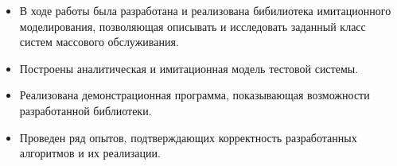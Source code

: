 \documentclass[12pt]{article}
\begin{document}
\small

\begin{itemize}

\item В ходе работы была разработана и реализована бибилиотека имитационного моделирования, позволяющая описывать и исследовать заданный класс систем массового обслуживания.

\item Построены аналитическая и имитационная модель тестовой системы.

\item Реализована демонстрационная программа, показывающая возможности разработанной библиотеки.

\item Проведен ряд опытов, подтверждающих корректность разработанных алгоритмов и их реализации.

\end{itemize}
\normalsize
\end{document}
